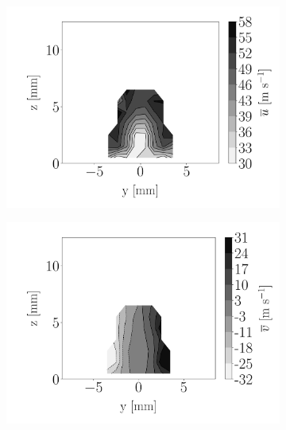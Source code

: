 \begin{figure}[h!]
\begin{subfigure}[b]{0.3\textwidth}
	\centering
   \includegraphics[scale=\scaleSLIJICF]{./part2_developments/figures_ch5_resolved_JICF/injectors_SLI/uG75_dx10_x05_ux_mean_map}
\end{subfigure}
   \hspace{0.17in}
\begin{subfigure}[b]{0.3\textwidth}
	\centering
   \includegraphics[scale=\scaleSLIJICF]{./part2_developments/figures_ch5_resolved_JICF/injectors_SLI/uG75_dx10_x05_uy_mean_map}
\end{subfigure}
   \hspace{0.17in}

\end{figure}
